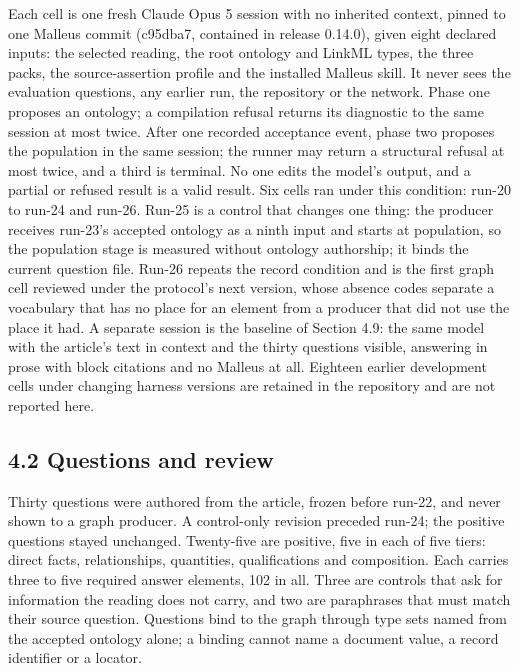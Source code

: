 Each cell is one fresh Claude Opus 5 session with no inherited context, pinned to one Malleus commit (c95dba7, contained in release 0.14.0), given eight declared inputs: the selected reading, the root ontology and LinkML types, the three packs, the source-assertion profile and the installed Malleus skill. It never sees the evaluation questions, any earlier run, the repository or the network. Phase one proposes an ontology; a compilation refusal returns its diagnostic to the same session at most twice. After one recorded acceptance event, phase two proposes the population in the same session; the runner may return a structural refusal at most twice, and a third is terminal. No one edits the model's output, and a partial or refused result is a valid result. Six cells ran under this condition: run-20 to run-24 and run-26. Run-25 is a control that changes one thing: the producer receives run-23's accepted ontology as a ninth input and starts at population, so the population stage is measured without ontology authorship; it binds the current question file. Run-26 repeats the record condition and is the first graph cell reviewed under the protocol's next version, whose absence codes separate a vocabulary that has no place for an element from a producer that did not use the place it had. A separate session is the baseline of Section 4.9: the same model with the article's text in context and the thirty questions visible, answering in prose with block citations and no Malleus at all. Eighteen earlier development cells under changing harness versions are retained in the repository and are not reported here.

\subsection*{4.2 Questions and review}

Thirty questions were authored from the article, frozen before run-22, and never shown to a graph producer. A control-only revision preceded run-24; the positive questions stayed unchanged. Twenty-five are positive, five in each of five tiers: direct facts, relationships, quantities, qualifications and composition. Each carries three to five required answer elements, 102 in all. Three are controls that ask for information the reading does not carry, and two are paraphrases that must match their source question. Questions bind to the graph through type sets named from the accepted ontology alone; a binding cannot name a document value, a record identifier or a locator.


